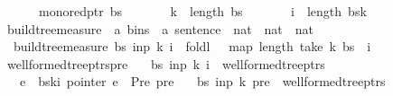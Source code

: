 \begin{isabellebody}
\ \ \ \ \ \ mono{\isacharunderscore}{\kern0pt}red{\isacharunderscore}{\kern0pt}ptr\ bs\ {\isasymand}\isanewline
\ \ \ \ \ \ k\ {\isacharless}{\kern0pt}\ length\ bs\ {\isasymand}\isanewline
\ \ \ \ \ \ i\ {\isacharless}{\kern0pt}\ length\ {\isacharparenleft}{\kern0pt}bs{\isacharbang}{\kern0pt}k{\isacharparenright}{\kern0pt}\isanewline
\ \ {\isacharbraceright}{\kern0pt}{\isachardoublequoteclose}\isanewline
\isanewline
{}\isamarkupfalse%
\ build{\isacharunderscore}{\kern0pt}tree{\isacharprime}{\kern0pt}{\isacharunderscore}{\kern0pt}measure\ {\isacharcolon}{\kern0pt}{\isacharcolon}{\kern0pt}\ {\isachardoublequoteopen}{\isacharparenleft}{\kern0pt}{\isacharprime}{\kern0pt}a\ bins\ {\isasymtimes}\ {\isacharprime}{\kern0pt}a\ sentence\ {\isasymtimes}\ nat\ {\isasymtimes}\ nat{\isacharparenright}{\kern0pt}\ {\isasymRightarrow}\ nat{\isachardoublequoteclose}\ \isanewline
\ \ {\isachardoublequoteopen}build{\isacharunderscore}{\kern0pt}tree{\isacharprime}{\kern0pt}{\isacharunderscore}{\kern0pt}measure\ {\isacharparenleft}{\kern0pt}bs{\isacharcomma}{\kern0pt}\ inp{\isacharcomma}{\kern0pt}\ k{\isacharcomma}{\kern0pt}\ i{\isacharparenright}{\kern0pt}\ {\isacharequal}{\kern0pt}\ foldl\ {\isacharparenleft}{\kern0pt}{\isacharplus}{\kern0pt}{\isacharparenright}{\kern0pt}\ {}\ {\isacharparenleft}{\kern0pt}map\ length\ {\isacharparenleft}{\kern0pt}take\ k\ bs{\isacharparenright}{\kern0pt}{\isacharparenright}{\kern0pt}\ {\isacharplus}{\kern0pt}\ i{\isachardoublequoteclose}\isanewline
\isanewline
{}\isamarkupfalse%
\ wellformed{\isacharunderscore}{\kern0pt}tree{\isacharunderscore}{\kern0pt}ptrs{\isacharunderscore}{\kern0pt}pre{\isacharcolon}{\kern0pt}\isanewline
\ \ \ {\isachardoublequoteopen}{\isacharparenleft}{\kern0pt}bs{\isacharcomma}{\kern0pt}\ inp{\isacharcomma}{\kern0pt}\ k{\isacharcomma}{\kern0pt}\ i{\isacharparenright}{\kern0pt}\ {\isasymin}\ wellformed{\isacharunderscore}{\kern0pt}tree{\isacharunderscore}{\kern0pt}ptrs{\isachardoublequoteclose}\isanewline
\ \ \ {\isachardoublequoteopen}e\ {\isacharequal}{\kern0pt}\ bs{\isacharbang}{\kern0pt}k{\isacharbang}{\kern0pt}i{\isachardoublequoteclose}\ {\isachardoublequoteopen}pointer\ e\ {\isacharequal}{\kern0pt}\ Pre\ pre{\isachardoublequoteclose}\isanewline
\ \ \ {\isachardoublequoteopen}{\isacharparenleft}{\kern0pt}bs{\isacharcomma}{\kern0pt}\ inp{\isacharcomma}{\kern0pt}\ {\isacharparenleft}{\kern0pt}k{\isacharminus}{\kern0pt}{}{\isacharparenright}{\kern0pt}{\isacharcomma}{\kern0pt}\ pre{\isacharparenright}{\kern0pt}\ {\isasymin}\ wellformed{\isacharunderscore}{\kern0pt}tree{\isacharunderscore}{\kern0pt}ptrs{\isachardoublequoteclose}%

\end{isabellebody}

